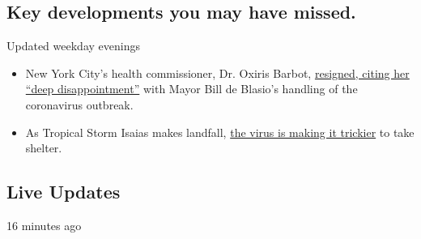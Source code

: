 \hypertarget{key-developments-you-may-have-missed}{%
\subsection{Key developments you may have
missed.}\label{key-developments-you-may-have-missed}}

Updated weekday evenings

\begin{itemize}
\tightlist
\item
  New York City's health commissioner, Dr. Oxiris Barbot,
  \href{https://www.nytimes.com/2020/08/04/nyregion/oxiris-barbot-health-commissioner-resigns.html}{resigned,
  citing her ``deep disappointment''} with Mayor Bill de Blasio's
  handling of the coronavirus outbreak.
\item
  As Tropical Storm Isaias makes landfall,
  \href{https://www.nytimes.com/2020/08/04/world/coronavirus-cases.html}{the
  virus is making it trickier} to take shelter.
\end{itemize}

\hypertarget{live-updates}{%
\subsection{Live Updates}\label{live-updates}}

16 minutes ago

